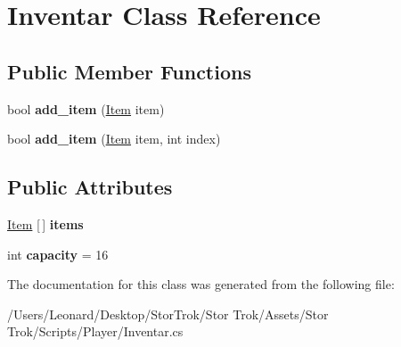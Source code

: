 \hypertarget{class_inventar}{}\section{Inventar Class Reference}
\label{class_inventar}
\subsection*{Public Member Functions}
\begin{DoxyCompactItemize}
\item 
\mbox{\label{class_inventar_a6958a3e3958f2e8cdcbaeeda9999c100}} 
bool {\bfseries add\+\_\+item} (\hyperlink{class_item}{Item} item)
\item 
\mbox{\label{class_inventar_a56116859c3721894aa5b93d4c3dfd7ca}} 
bool {\bfseries add\+\_\+item} (\hyperlink{class_item}{Item} item, int index)
\end{DoxyCompactItemize}
\subsection*{Public Attributes}
\begin{DoxyCompactItemize}
\item 
\mbox{\label{class_inventar_a052494e4e79676f4e4b76d2667146357}} 
\hyperlink{class_item}{Item} \mbox{[}$\,$\mbox{]} {\bfseries items}
\item 
\mbox{\label{class_inventar_ab1393d898b97709b67eb7376daa37913}} 
int {\bfseries capacity} = 16
\end{DoxyCompactItemize}


The documentation for this class was generated from the following file\+:\begin{DoxyCompactItemize}
\item 
/\+Users/\+Leonard/\+Desktop/\+Stor\+Trok/\+Stor Trok/\+Assets/\+Stor Trok/\+Scripts/\+Player/Inventar.\+cs\end{DoxyCompactItemize}
